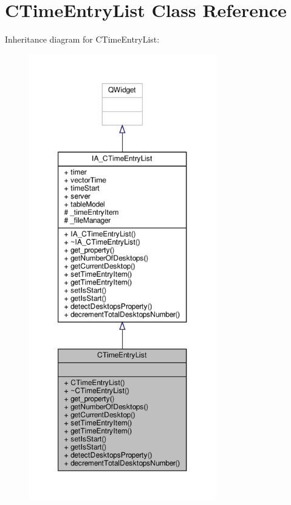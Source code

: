 \hypertarget{classCTimeEntryList}{}\section{C\+Time\+Entry\+List Class Reference}
\label{classCTimeEntryList}


Inheritance diagram for C\+Time\+Entry\+List\+:
\nopagebreak
\begin{figure}[H]
\begin{center}
\leavevmode
\includegraphics[height=550pt]{classCTimeEntryList__inherit__graph}
\end{center}
\end{figure}


